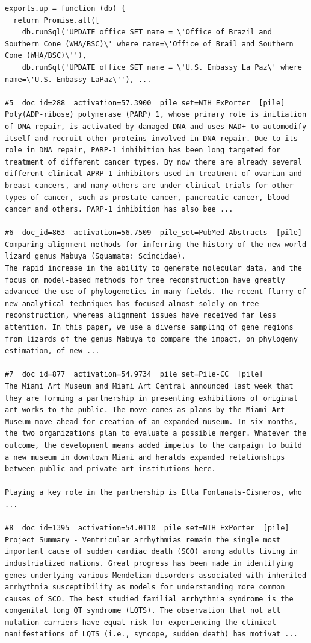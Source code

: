 \begin{verbatim}
exports.up = function (db) {
  return Promise.all([
    db.runSql('UPDATE office SET name = \'Office of Brazil and Southern Cone (WHA/BSC)\' where name=\'Office of Brail and Southern Cone (WHA/BSC)\''),
    db.runSql('UPDATE office SET name = \'U.S. Embassy La Paz\' where name=\'U.S. Embassy LaPaz\''), ...

#5  doc_id=288  activation=57.3900  pile_set=NIH ExPorter  [pile]
Poly(ADP-ribose) polymerase (PARP) 1, whose primary role is initiation of DNA repair, is activated by damaged DNA and uses NAD+ to automodify itself and recruit other proteins involved in DNA repair. Due to its role in DNA repair, PARP-1 inhibition has been long targeted for treatment of different cancer types. By now there are already several different clinical APRP-1 inhibitors used in treatment of ovarian and breast cancers, and many others are under clinical trials for other types of cancer, such as prostate cancer, pancreatic cancer, blood cancer and others. PARP-1 inhibition has also bee ...

#6  doc_id=863  activation=56.7509  pile_set=PubMed Abstracts  [pile]
Comparing alignment methods for inferring the history of the new world lizard genus Mabuya (Squamata: Scincidae).
The rapid increase in the ability to generate molecular data, and the focus on model-based methods for tree reconstruction have greatly advanced the use of phylogenetics in many fields. The recent flurry of new analytical techniques has focused almost solely on tree reconstruction, whereas alignment issues have received far less attention. In this paper, we use a diverse sampling of gene regions from lizards of the genus Mabuya to compare the impact, on phylogeny estimation, of new ...

#7  doc_id=877  activation=54.9734  pile_set=Pile-CC  [pile]
The Miami Art Museum and Miami Art Central announced last week that they are forming a partnership in presenting exhibitions of original art works to the public. The move comes as plans by the Miami Art Museum move ahead for creation of an expanded museum. In six months, the two organizations plan to evaluate a possible merger. Whatever the outcome, the development means added impetus to the campaign to build a new museum in downtown Miami and heralds expanded relationships between public and private art institutions here.

Playing a key role in the partnership is Ella Fontanals-Cisneros, who ...

#8  doc_id=1395  activation=54.0110  pile_set=NIH ExPorter  [pile]
Project Summary - Ventricular arrhythmias remain the single most important cause of sudden cardiac death (SCO) among adults living in industrialized nations. Great progress has been made in identifying genes underlying various Mendelian disorders associated with inherited arrhythmia susceptibility as models for understanding more common causes of SCO. The best studied familial arrhythmia syndrome is the congenital long QT syndrome (LQTS). The observation that not all mutation carriers have equal risk for experiencing the clinical manifestations of LQTS (i.e., syncope, sudden death) has motivat ...


\end{verbatim}
